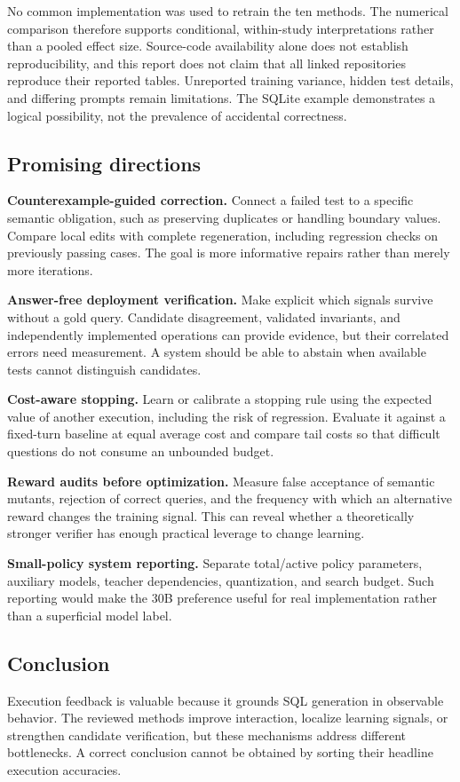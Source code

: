\documentclass[11pt,a4paper]{article}
\begin{document}
No common implementation was used to retrain the ten methods. The numerical comparison therefore supports conditional, within-study interpretations rather than a pooled effect size. Source-code availability alone does not establish reproducibility, and this report does not claim that all linked repositories reproduce their reported tables. Unreported training variance, hidden test details, and differing prompts remain limitations. The SQLite example demonstrates a logical possibility, not the prevalence of accidental correctness.

\subsection{Promising directions}
\textbf{Counterexample-guided correction.} Connect a failed test to a specific semantic obligation, such as preserving duplicates or handling boundary values. Compare local edits with complete regeneration, including regression checks on previously passing cases. The goal is more informative repairs rather than merely more iterations.

\textbf{Answer-free deployment verification.} Make explicit which signals survive without a gold query. Candidate disagreement, validated invariants, and independently implemented operations can provide evidence, but their correlated errors need measurement. A system should be able to abstain when available tests cannot distinguish candidates.

\textbf{Cost-aware stopping.} Learn or calibrate a stopping rule using the expected value of another execution, including the risk of regression. Evaluate it against a fixed-turn baseline at equal average cost and compare tail costs so that difficult questions do not consume an unbounded budget.

\textbf{Reward audits before optimization.} Measure false acceptance of semantic mutants, rejection of correct queries, and the frequency with which an alternative reward changes the training signal. This can reveal whether a theoretically stronger verifier has enough practical leverage to change learning.

\textbf{Small-policy system reporting.} Separate total/active policy parameters, auxiliary models, teacher dependencies, quantization, and search budget. Such reporting would make the 30B preference useful for real implementation rather than a superficial model label.

\subsection{Conclusion}
Execution feedback is valuable because it grounds SQL generation in observable behavior. The reviewed methods improve interaction, localize learning signals, or strengthen candidate verification, but these mechanisms address different bottlenecks. A correct conclusion cannot be obtained by sorting their headline execution accuracies.
\end{document}
